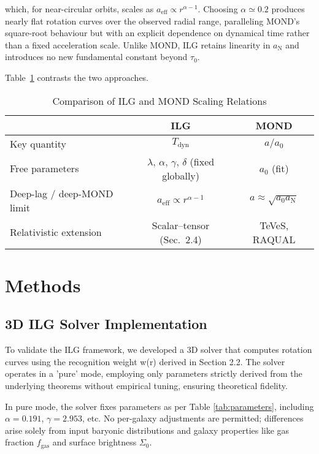 \documentclass[12pt,a4paper]{article}
\begin{document}
which, for near-circular orbits, scales as $a_\mathrm{eff} \propto r^{\alpha-1}$.  Choosing $\alpha \simeq 0.2$ produces nearly flat rotation curves over the observed radial range, paralleling MOND's square-root behaviour but with an explicit dependence on dynamical time rather than a fixed acceleration scale.  Unlike MOND, ILG retains linearity in $a_\mathrm{N}$ and introduces no new fundamental constant beyond $\tau_0$.

Table~\ref{tab:mond_compare} contrasts the two approaches.

\begin{table}[h]
\centering
\caption{Comparison of ILG and MOND Scaling Relations}
\label{tab:mond_compare}
\begin{tabular}{l c c}
\toprule
 & ILG & MOND \\
\midrule
Key quantity & $T_\mathrm{dyn}$ & $a/a_0$ \\
Free parameters & $\lambda,\,\alpha,\,\gamma,\,\delta$ (fixed globally) & $a_0$ (fit) \\
Deep-lag / deep-MOND limit & $a_\mathrm{eff} \propto r^{\alpha-1}$ & $a \approx \sqrt{a_0 a_\mathrm{N}}$ \\
Relativistic extension & Scalar–tensor (Sec.~2.4) & TeVeS, RAQUAL \\
\bottomrule
\end{tabular}
\end{table}

\section{Methods}

\subsection{3D ILG Solver Implementation}

To validate the ILG framework, we developed a 3D solver that computes rotation curves using the recognition weight w(r) derived in Section 2.2. The solver operates in a 'pure' mode, employing only parameters strictly derived from the underlying theorems without empirical tuning, ensuring theoretical fidelity.

In pure mode, the solver fixes parameters as per Table \ref{tab:parameters}, including $\alpha = 0.191$, $\gamma = 2.953$, etc. No per-galaxy adjustments are permitted; differences arise solely from input baryonic distributions and galaxy properties like gas fraction $f_\mathrm{gas}$ and surface brightness $\Sigma_0$.
\end{document}
